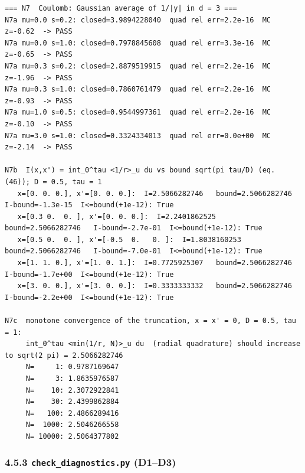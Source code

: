\documentclass[11pt,a4paper]{article}
\begin{document}
\begin{lstlisting}
=== N7  Coulomb: Gaussian average of 1/|y| in d = 3 ===
N7a mu=0.0 s=0.2: closed=3.9894228040  quad rel err=2.2e-16  MC z=-0.62  -> PASS
N7a mu=0.0 s=1.0: closed=0.7978845608  quad rel err=3.3e-16  MC z=-0.65  -> PASS
N7a mu=0.3 s=0.2: closed=2.8879519915  quad rel err=2.2e-16  MC z=-1.96  -> PASS
N7a mu=0.3 s=1.0: closed=0.7860761479  quad rel err=2.2e-16  MC z=-0.93  -> PASS
N7a mu=1.0 s=0.5: closed=0.9544997361  quad rel err=2.2e-16  MC z=-0.10  -> PASS
N7a mu=3.0 s=1.0: closed=0.3324334013  quad rel err=0.0e+00  MC z=-2.14  -> PASS

N7b  I(x,x') = int_0^tau <1/r>_u du vs bound sqrt(pi tau/D) (eq. (46)); D = 0.5, tau = 1
   x=[0. 0. 0.], x'=[0. 0. 0.]:  I=2.5066282746   bound=2.5066282746   I-bound=-1.3e-15  I<=bound(+1e-12): True
   x=[0.3 0.  0. ], x'=[0. 0. 0.]:  I=2.2401862525   bound=2.5066282746   I-bound=-2.7e-01  I<=bound(+1e-12): True
   x=[0.5 0.  0. ], x'=[-0.5  0.   0. ]:  I=1.8038160253   bound=2.5066282746   I-bound=-7.0e-01  I<=bound(+1e-12): True
   x=[1. 1. 0.], x'=[1. 0. 1.]:  I=0.7725925307   bound=2.5066282746   I-bound=-1.7e+00  I<=bound(+1e-12): True
   x=[3. 0. 0.], x'=[3. 0. 0.]:  I=0.3333333332   bound=2.5066282746   I-bound=-2.2e+00  I<=bound(+1e-12): True

N7c  monotone convergence of the truncation, x = x' = 0, D = 0.5, tau = 1:
     int_0^tau <min(1/r, N)>_u du  (radial quadrature) should increase to sqrt(2 pi) = 2.5066282746
     N=     1: 0.9787169647
     N=     3: 1.8635976587
     N=    10: 2.3072922841
     N=    30: 2.4399862884
     N=   100: 2.4866289416
     N=  1000: 2.5046266558
     N= 10000: 2.5064377802
\end{lstlisting}

\hypertarget{check_diagnostics.py-d1d3}{%
\subsubsection{\texorpdfstring{4.5.3 \texttt{check\_diagnostics.py} (D1--D3)}{4.5.3  (D1--D3)}}\label{check_diagnostics.py-d1d3}}
\end{document}
